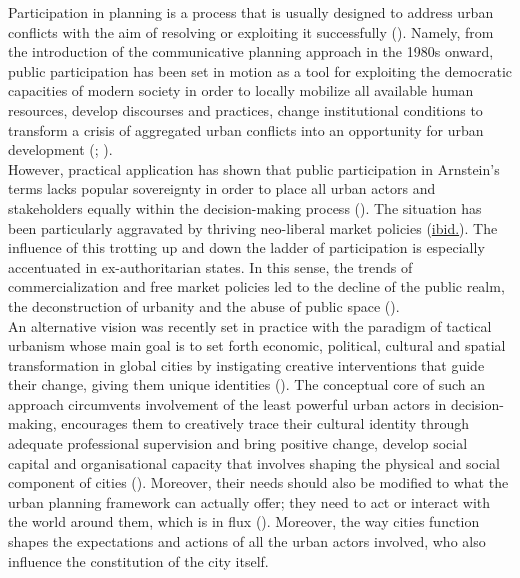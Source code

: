 \documentclass[11pt]{report}
\begin{document}
{{{Participation in planning is a process that is usually designed to address urban conflicts with the aim of resolving or exploiting it successfully (\href{Fisher}{\citealt{fisher_building_2001}}).
Namely, from the introduction of the communicative planning approach in the 1980s onward, public participation has been set in motion as a tool for exploiting the democratic capacities of modern society in order to locally mobilize all available human resources, develop discourses and practices, change institutional conditions to transform a crisis of aggregated urban conflicts into an opportunity for urban development
(\href{Healey}{\citealt{healey_communicative_1996}}; \href{Scharpf}{\citealt{scharpf_XXX_1997}}).
\\

However, practical application has shown that public participation in Arnstein’s terms lacks popular sovereignty in order to place all urban actors and stakeholders equally within the decision-making process
(\href{Mouffe}{\citealt{mouffe_which_2002}}).
The situation has been particularly aggravated by thriving neo-liberal market policies (\href{Mouffe}{ibid.}).
The influence of this trotting up and down the ladder of participation is especially accentuated in ex-authoritarian states.
In this sense, the trends of commercialization and free market policies led to the decline of the public realm, the deconstruction of urbanity and the abuse of public space
(\href{Hirt}{\citealt{hirt_landscapes_2008}}).
\\

An alternative vision was recently set in practice with the paradigm of tactical urbanism whose main goal is to set forth economic, political, cultural and spatial transformation in global cities by instigating creative interventions that guide their change, giving them unique identities
(\href{Lydon}{\citealt{lydon_tactical_2012}}).
The conceptual core of such an approach circumvents involvement of the least powerful urban actors in decision-making, encourages them to creatively trace their cultural identity through adequate professional supervision and bring positive change, develop social capital and organisational capacity that involves shaping the physical and social component of cities 
(\href{Bolay}{\citealt{bolay_planning_1996}}).
Moreover, their needs should also be modified to what the urban planning framework can actually offer; they need to act or interact with the world around them, which is in flux
(\href{Harvey}{\citealt{harvey_condition_2003}}).
Moreover, the way cities function shapes the expectations and actions of all the urban actors involved, who also influence the constitution of the city itself.
\\

}}}
\end{document}
